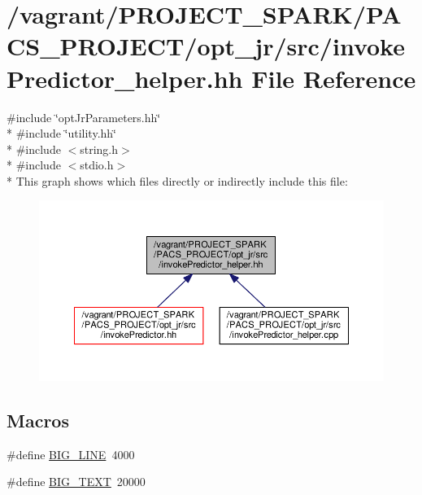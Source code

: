 \hypertarget{invokePredictor__helper_8hh}{\section{/vagrant/\-P\-R\-O\-J\-E\-C\-T\-\_\-\-S\-P\-A\-R\-K/\-P\-A\-C\-S\-\_\-\-P\-R\-O\-J\-E\-C\-T/opt\-\_\-jr/src/invoke\-Predictor\-\_\-helper.hh File Reference}
\label{invokePredictor__helper_8hh}
}
{\ttfamily \#include \char`\"{}opt\-Jr\-Parameters.\-hh\char`\"{}}\\*
{\ttfamily \#include \char`\"{}utility.\-hh\char`\"{}}\\*
{\ttfamily \#include $<$string.\-h$>$}\\*
{\ttfamily \#include $<$stdio.\-h$>$}\\*
This graph shows which files directly or indirectly include this file\-:\nopagebreak
\begin{figure}[H]
\begin{center}
\leavevmode
\includegraphics[width=350pt]{invokePredictor__helper_8hh__dep__incl}
\end{center}
\end{figure}
\subsection*{Macros}
\begin{DoxyCompactItemize}
\item 
\#define \hyperlink{invokePredictor__helper_8hh_adf5fb2a227e3abadea9424e33cc02705}{B\-I\-G\-\_\-\-L\-I\-N\-E}~4000
\item 
\#define \hyperlink{invokePredictor__helper_8hh_af5bc9b073dea33e26386656ad6be5ef7}{B\-I\-G\-\_\-\-T\-E\-X\-T}~20000
\end{DoxyCompactItemize}
